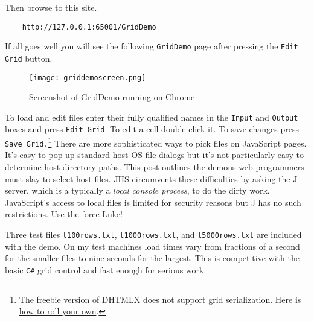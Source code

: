 \noindent Then browse to this site.

\begin{tcolorbox}[breakable, size=fbox, boxrule=1pt, pad at break*=1mm,colback=cellbackground, colframe=cellborder]
\begin{verbatim}
    http://127.0.0.1:65001/GridDemo
\end{verbatim}
\end{tcolorbox}

\noindent If all goes well you will see the following \texttt{GridDemo} page after
pressing the \texttt{Edit Grid} button.



\captionsetup[figure]{labelformat=empty}
\begin{figure}[htbp]
\centering
\href{http://bakerjd99.wordpress.com/2012/12/03/jhs-with-the-dhtmlx-grid/griddemoscreen/}{\texttt{[image: griddemoscreen.png]}}
\caption{Screenshot of GridDemo running on Chrome}
\label{fig:3467X0}
\end{figure}


To load and edit files enter their fully qualified names in the
\texttt{Input} and \texttt{Output} boxes and press \texttt{Edit Grid}.
To edit a cell double-click it. To save changes press
\texttt{Save Grid.}\footnote{
 The freebie version of DHTMLX does not support grid serialization.
  \href{http://bakerjd99.wordpress.com/2012/12/04/more-about-jhs-with-dhtmlx-the-grid/}{Here
  is how to roll your own}.
} There are more
sophisticated ways to pick files on JavaScript pages. It's easy to pop
up standard host OS file dialogs but it's not particularly easy to
determine host directory paths.
\href{http://robertnyman.com/2010/12/16/utilizing-the-html5-file-api-to-choose-upload-preview-and-see-progress-for-multiple-files/}{This
post} outlines the demons web programmers must slay to select host
files. JHS circumvents these difficulties by asking the J server, which
is a typically a \emph{local console process}, to do the dirty work.
JavaScript's access to local files is limited for security reasons but J
has no such restrictions.
\href{http://www.youtube.com/watch?v=-fSj6LxsZes}{Use the force Luke!}

Three test files \texttt{t100rows.txt}, \texttt{t1000rows.txt}, and
\texttt{t5000rows.txt} are included with the demo. On my test machines
load times vary from fractions of a second for the smaller files to nine
seconds for the largest. This is competitive with the basic \texttt{C\#}
grid control and fast enough for serious work.

